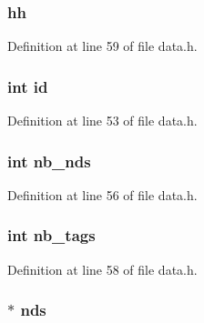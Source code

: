\subsubsection[{\texorpdfstring{hh}{hh}}]{ hh}\hypertarget{struct_way_a67d3d81a4f9a9622b0befade8d131661}{}\label{struct_way_a67d3d81a4f9a9622b0befade8d131661}


Definition at line 59 of file data.\+h.

\subsubsection[{\texorpdfstring{id}{id}}]{\setlength{\rightskip}{0pt plus 5cm}int id}\hypertarget{struct_way_a7441ef0865bcb3db9b8064dd7375c1ea}{}\label{struct_way_a7441ef0865bcb3db9b8064dd7375c1ea}


Definition at line 53 of file data.\+h.

\subsubsection[{\texorpdfstring{nb\+\_\+nds}{nb_nds}}]{\setlength{\rightskip}{0pt plus 5cm}int nb\+\_\+nds}\hypertarget{struct_way_a2a8e25be588f6da164fe5fea4040d76c}{}\label{struct_way_a2a8e25be588f6da164fe5fea4040d76c}


Definition at line 56 of file data.\+h.

\subsubsection[{\texorpdfstring{nb\+\_\+tags}{nb_tags}}]{\setlength{\rightskip}{0pt plus 5cm}int nb\+\_\+tags}\hypertarget{struct_way_a5090182abe45c6d1577adb6c195378f3}{}\label{struct_way_a5090182abe45c6d1577adb6c195378f3}


Definition at line 58 of file data.\+h.

\subsubsection[{\texorpdfstring{nds}{nds}}]{$\ast$ nds}\hypertarget{struct_way_aeda4fa95d94e394e147ebf2bfe497071}{}\label{struct_way_aeda4fa95d94e394e147ebf2bfe497071}


